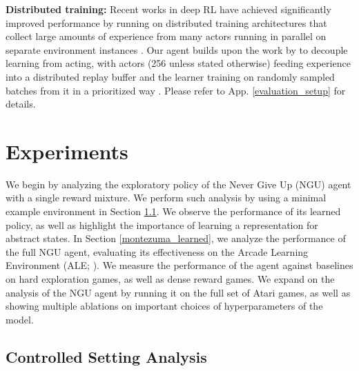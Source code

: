 \documentclass{article} %
\begin{document}
{\bf Distributed training:}
Recent works in deep RL have achieved significantly improved performance by running on distributed training architectures that collect large amounts of experience from many actors running in parallel on separate environment instances \citep{andrychowicz2018learning, barth2018distributed,  burda2018exploration,espeholt2018impala, horgan2018distributed, r2d2,silver2016mastering}.
%
Our agent builds upon the work by \cite{r2d2} to decouple learning from acting,
with actors (256 unless stated otherwise) feeding experience into a distributed replay buffer and the learner training on randomly sampled batches from it in a prioritized way \citep{PrioritizedReplay}.
Please refer to App. \ref{evaluation_setup} for details.
%
%

\section{Experiments}
\label{experiments}

We begin by analyzing the exploratory policy of the Never Give Up (NGU) agent with a single reward mixture. We perform such analysis by using a minimal example environment in Section \ref{embedding_representation}. We observe the performance of its learned policy, as well as highlight the importance of learning a representation for abstract states.
%
In Section \ref{montezuma_learned}, we analyze the performance of the full NGU agent, evaluating its effectiveness on the Arcade Learning Environment (ALE; \cite{bellemare2013arcade}). We measure the performance of the agent against baselines on hard exploration games, as well as dense reward games.
%
We expand on the analysis of the NGU agent by running it on the full set of Atari games, as well as showing multiple ablations on important choices of hyperparameters of the model.

\subsection{Controlled Setting Analysis}
\label{embedding_representation}
\end{document}
